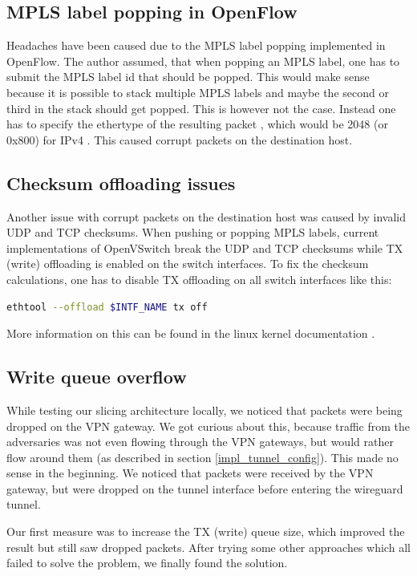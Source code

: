 \subsection{MPLS label popping in OpenFlow}
Headaches have been caused due to the MPLS label popping implemented in OpenFlow. The author assumed, that when popping an MPLS label, one has to submit the MPLS label id that should be popped. This would make sense because it is possible to stack multiple MPLS labels and maybe the second or third in the stack should get popped. This is however not the case. Instead one has to specify the ethertype of the resulting packet \cite{openflow}, which would be 2048 (or 0x800) for IPv4 \cite{rfc7042}. This caused corrupt packets on the destination host.

\subsection{Checksum offloading issues}
Another issue with corrupt packets on the destination host was caused by invalid UDP and TCP checksums. When pushing or popping MPLS labels, current implementations of OpenVSwitch break the UDP and TCP checksums while TX (write) offloading is enabled on the switch interfaces. To fix the checksum calculations, one has to disable TX offloading on all switch interfaces like this:

\begin{lstlisting}[language=bash]
ethtool --offload $INTF_NAME tx off
\end{lstlisting}

More information on this can be found in the linux kernel documentation \cite{txoffload}.

\subsection{Write queue overflow}
While testing our slicing architecture locally, we noticed that packets were being dropped on the VPN gateway. We got curious about this, because traffic from the adversaries was not even flowing through the VPN gateways, but would rather flow around them (as described in section \ref{impl_tunnel_config}). This made no sense in the beginning. We noticed that packets were received by the VPN gateway, but were dropped on the tunnel interface before entering the wireguard tunnel.

Our first measure was to increase the TX (write) queue size, which improved the result but still saw dropped packets. After trying some other approaches which all failed to solve the problem, we finally found the solution.

